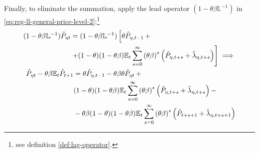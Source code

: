 \documentclass[
thesis.tex
]{subfiles}
\begin{document}
Finally, to eliminate the summation, apply the lead operator $(1- \theta \beta \mathbb{L}^{-1})$ in \ref{eq:reg-ll-general-price-level-2}:\footnote{see definition \ref{def:lag-operator}.}
\begin{align}
	\begin{split}
		(1- \theta \beta \mathbb{L}^{-1}) \hat{P}_{\eta t} &= (1- \theta \beta \mathbb{L}^{-1}) \left[ \theta \hat{P}_{\eta, t-1} \, + \right. \\
		&\left. + (1-\theta) (1- \theta \beta) {\mathbb{E}_{t}} \sum_{s=0}^{\infty} \left( \theta \beta \right)^s \left( \hat{P}_{\eta, t+s} + \hat{\lambda}_{\eta, t+s} \right) \right] \implies \nonumber
	\end{split} \\
	\begin{split}
		\hat{P}_{\eta t} - \theta \beta {\mathbb{E}_{t}} \hat{P}_{t+1} &= \theta \hat{P}_{\eta, t-1} - \theta \beta \theta \hat{P}_{\eta t} \, + \\
		& (1-\theta) (1- \theta \beta) {\mathbb{E}_{t}} \sum_{s=0}^{\infty} \left( \theta \beta \right)^s \left( \hat{P}_{\eta, t+s} + \hat{\lambda}_{\eta, t+s} \right) - \\
		& - \theta \beta (1-\theta) (1- \theta \beta) {\mathbb{E}_{t}} \sum_{s=0}^{\infty} \left( \theta \beta \right)^s \left( \hat{P}_{t+s+1} + \hat{\lambda}_{\eta, t+s+1} \right)
	\end{split} \label{eq:reg-ll-general-price-level-3}
\end{align}
\end{document}
